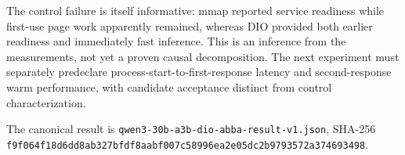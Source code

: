 The control failure is itself informative: mmap reported service readiness
while first-use page work apparently remained, whereas DIO provided both
earlier readiness and immediately fast inference.  This is an inference from
the measurements, not yet a proven causal decomposition.  The next experiment
must separately predeclare process-start-to-first-response latency and
second-response warm performance, with candidate acceptance distinct from
control characterization.

The canonical result is
\texttt{qwen3-30b-a3b-dio-abba-result-v1.json}, SHA-256
\texttt{f9f064f18d6dd8ab327bfdf8aabf007c58996ea2e05dc2b9793572a374693498}.

